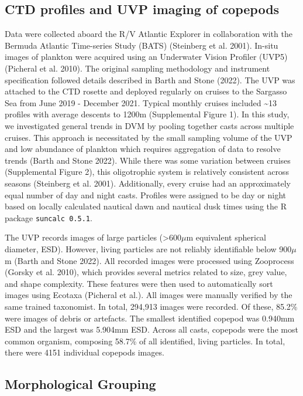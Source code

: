 \documentclass[
]{article}
\begin{document}
\hypertarget{ctd-profiles-and-uvp-imaging-of-copepods}{%
\subsection{CTD profiles and UVP imaging of
copepods}\label{ctd-profiles-and-uvp-imaging-of-copepods}}

Data were collected aboard the R/V Atlantic Explorer in collaboration
with the Bermuda Atlantic Time-series Study (BATS) (Steinberg et al.
2001). In-situ images of plankton were acquired using an Underwater
Vision Profiler (UVP5) (Picheral et al. 2010). The original sampling
methodology and instrument specification followed details described in
Barth and Stone (2022). The UVP was attached to the CTD rosette and
deployed regularly on cruises to the Sargasso Sea from June 2019 -
December 2021. Typical monthly cruises included \textasciitilde13
profiles with average descents to 1200m (Supplemental Figure 1). In this
study, we investigated general trends in DVM by pooling together casts
across multiple cruises. This approach is necessitated by the small
sampling volume of the UVP and low abundance of plankton which requires
aggregation of data to resolve trends (Barth and Stone 2022). While
there was some variation between cruises (Supplemental Figure 2), this
oligotrophic system is relatively consistent across seasons (Steinberg
et al. 2001). Additionally, every cruise had an approximately equal
number of day and night casts. Profiles were assigned to be day or night
based on locally calculated nautical dawn and nautical dusk times using
the R package \texttt{suncalc\ 0.5.1}.

The UVP records images of large particles (\textgreater600\(\mu\)m
equivalent spherical diameter, ESD). However, living particles are not
reliably identifiable below 900\(\mu\)m (Barth and Stone 2022). All
recorded images were processed using Zooprocess (Gorsky et al. 2010),
which provides several metrics related to size, grey value, and shape
complexity. These features were then used to automatically sort images
using Ecotaxa (Picheral et al.). All images were manually verified by
the same trained taxonomist. In total, 294,913 images were recorded. Of
these, 85.2\% were images of debris or artefacts. The smallest
identified copepod was 0.940mm ESD and the largest was 5.904mm ESD.
Across all casts, copepods were the most common organism, composing
58.7\% of all identified, living particles. In total, there were 4151
individual copepods images.

\hypertarget{morphological-grouping}{%
\subsection{Morphological Grouping}\label{morphological-grouping}}
\end{document}
